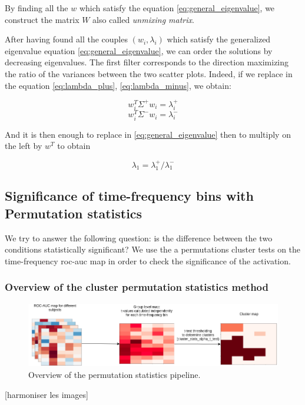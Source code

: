 By finding all the $w$ which satisfy the equation \ref{eq:general_eigenvalue}, we construct the matrix $W$ also called \textit{unmixing matrix}.

After having found all the couples $(w_i, \lambda_i)$ which satisfy the generalized eigenvalue equation \ref{eq:general_eigenvalue}, we can order the solutions by decreasing eigenvalues. The first filter corresponds to the direction maximizing the ratio of the variances between the two scatter plots. Indeed, if we replace in the equation \ref{eq:lambda_plus}, \ref{eq:lambda_minus}, we obtain:

\begin{equation}
    w^{T}_{i} \Sigma^{+} w_{i} = \lambda^{+}_{i}
    \label{eq:lambda_plus_first_component}
\end{equation}
\begin{equation}
    w^{T}_{i} \Sigma^{-} w_{i} = \lambda^{-}_{i}
    \label{eq:lambda_minus_first_component}
\end{equation}

And it is then enough to replace in \ref{eq:general_eigenvalue} then to multiply on the left by $w^{T}$ to obtain


\begin{equation}
    \lambda_1 = \lambda^{+}_1 / \lambda^{-}_1
\end{equation}


\subsection{Significance of time-frequency bins with Permutation statistics}

We try to answer the following question: is the difference between
the two conditions statistically significant? We use the a permutations
cluster tests on the time-frequency roc-auc map in order to check the significance of the activation.

\subsubsection{Overview of the cluster permutation statistics method}

\begin{figure}[ht]
    \centering
    \includegraphics[width=15cm]{images_report/sensor/Permutation_statistics.png}
    \caption[Overview of the permutation statistics pipeline.]%
    {Overview of the permutation statistics pipeline.}
    \label{permutation_statistics_pipeline}
\end{figure}
[harmoniser les images]

